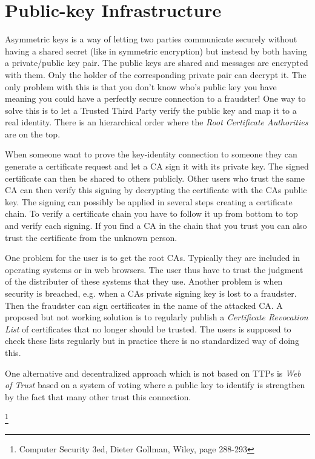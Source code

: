 \documentclass[10pt, a4paper]{article}
\begin{document}
\section{Public-key Infrastructure}
\label{sec+pki}

Asymmetric keys is a way of letting two parties communicate securely without having a shared secret (like in symmetric encryption) but instead by both having a private/public key pair. The public keys are shared and messages are encrypted with them. Only the holder of the corresponding private pair can decrypt it. The only problem with this is that you don't know who's public key you have meaning you could have a perfectly secure connection to a fraudster! One way to solve this is to let a Trusted Third Party verify the public key and map it to a real identity. There is an hierarchical order where the \emph{Root Certificate Authorities} are on the top. 

When someone want to prove the key-identity connection to someone they can generate a certificate request and let a CA sign it with its private key. The signed certificate can then be shared to others publicly. Other users who trust the same CA can then verify this signing by decrypting the certificate with the CAs public key. The signing can possibly be applied in several steps creating a certificate chain. To verify a certificate chain you have to follow it up from bottom to top and verify each signing. If you find a CA in the chain that you trust you can also trust the certificate from the unknown person.

One problem for the user is to get the root CAs. Typically they are included in operating systems or in web browsers. The user thus have to trust the judgment of the distributer of these systems that they use. Another problem is when security is breached, e.g. when a CAs private signing key is lost to a fraudster. Then the fraudster can sign certificates in the name of the attacked CA. A proposed but not working solution is to regularly publish a \emph{Certificate Revocation List} of certificates that no longer should be trusted. The users is supposed to check these lists regularly but in practice there is no standardized way of doing this.

One alternative and decentralized approach which is not based on TTPs is \emph{Web of Trust} based on a system of voting where a public key to identify is strengthen by the fact that many other trust this connection.

\footnote{Computer Security 3ed, Dieter Gollman, Wiley, page 288-293}
\end{document}

